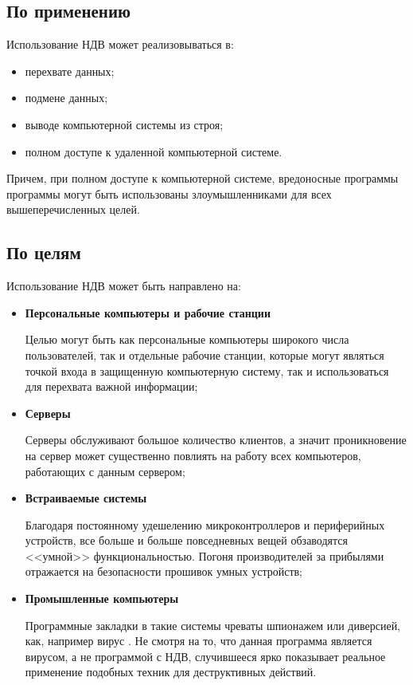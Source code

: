     \subsection{По применению}\label{sec:ch1/sec2/sub1}
    Использование НДВ может реализовываться в:
    \begin{itemize}
        \item перехвате данных;
        \item подмене данных;
        \item выводе компьютерной системы из строя;
        \item полном доступе к удаленной компьютерной системе.
    \end{itemize}
    Причем, при полном доступе к компьютерной системе, вредоносные программы
    программы могут быть использованы злоумышленниками для
    всех вышеперечисленных целей.

\subsection{По целям}\label{sec:ch1/sec2/sub2}
Использование НДВ может быть направлено на:
\begin{itemize}
    \item \textbf{Персональные компьютеры и рабочие станции}
          
          Целью могут быть как персональные компьютеры широкого числа пользователей,
          так и отдельные рабочие станции, которые могут являться точкой входа в
          защищенную компьютерную систему, так и использоваться для перехвата важной
          информации;
    \item \textbf{Серверы}
          
          Серверы обслуживают большое количество клиентов, а значит проникновение на
          сервер может существенно повлиять на работу всех компьютеров, работающих с
          данным сервером;
    \item \textbf{Встраиваемые системы}

          Благодаря постоянному удешелению микроконтроллеров и периферийных устройств,
          все больше и больше повседневных вещей обзаводятся <<умной>> функциональностью.
          Погоня производителей за прибылями отражается на безопасности прошивок умных устройств;
    \item \textbf{Промышленные компьютеры}

        Программные закладки в такие системы чреваты шпионажем или диверсией, как, например
        вирус \autocite{stuxnet}. Не смотря на то, что данная программа является вирусом, а
        не программой с НДВ, случившееся ярко показывает реальное применение подобных техник 
        для деструктивных действий.
\end{itemize}

